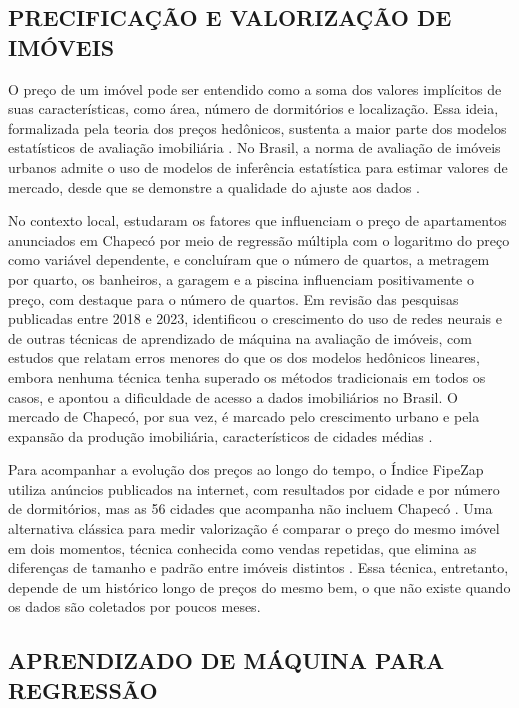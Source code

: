 \documentclass[
  article,
  a4paper,
  12pt,
  fleqn,
  oneside,
  chapter = TITLE,
  section = TITLE,
]{abntex2}
\begin{document}
\subsection{PRECIFICAÇÃO E VALORIZAÇÃO DE IMÓVEIS}

O preço de um imóvel pode ser entendido como a soma dos valores implícitos de suas características, como área, número de dormitórios e localização. Essa ideia, formalizada pela teoria dos preços hedônicos, sustenta a maior parte dos modelos estatísticos de avaliação imobiliária \cite{rosen1974}. No Brasil, a norma de avaliação de imóveis urbanos admite o uso de modelos de inferência estatística para estimar valores de mercado, desde que se demonstre a qualidade do ajuste aos dados \cite{abnt14653}.

No contexto local, \textcite{reza2025} estudaram os fatores que influenciam o preço de apartamentos anunciados em Chapecó por meio de regressão múltipla com o logaritmo do preço como variável dependente, e concluíram que o número de quartos, a metragem por quarto, os banheiros, a garagem e a piscina influenciam positivamente o preço, com destaque para o número de quartos. Em revisão das pesquisas publicadas entre 2018 e 2023, \textcite{ferreira2024} identificou o crescimento do uso de redes neurais e de outras técnicas de aprendizado de máquina na avaliação de imóveis, com estudos que relatam erros menores do que os dos modelos hedônicos lineares, embora nenhuma técnica tenha superado os métodos tradicionais em todos os casos, e apontou a dificuldade de acesso a dados imobiliários no Brasil. O mercado de Chapecó, por sua vez, é marcado pelo crescimento urbano e pela expansão da produção imobiliária, característicos de cidades médias \cite{silva2023}.

Para acompanhar a evolução dos preços ao longo do tempo, o Índice FipeZap utiliza anúncios publicados na internet, com resultados por cidade e por número de dormitórios, mas as 56 cidades que acompanha não incluem Chapecó \cite{fipe2026}. Uma alternativa clássica para medir valorização é comparar o preço do mesmo imóvel em dois momentos, técnica conhecida como vendas repetidas, que elimina as diferenças de tamanho e padrão entre imóveis distintos \cite{bailey1963,case1989}. Essa técnica, entretanto, depende de um histórico longo de preços do mesmo bem, o que não existe quando os dados são coletados por poucos meses.

\subsection{APRENDIZADO DE MÁQUINA PARA REGRESSÃO}
\end{document}
